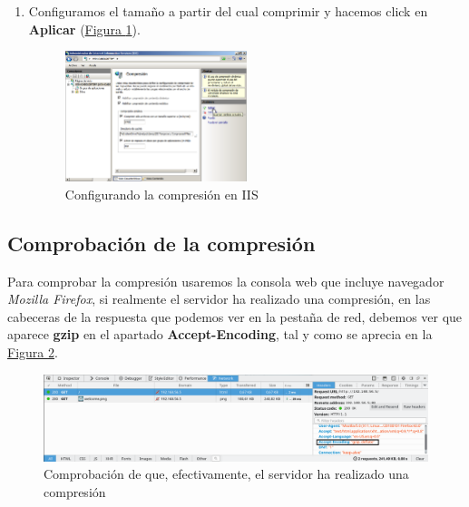\documentclass[10pt,a4paper,spanish]{article}
\numberwithin{equation}{section} %
\numberwithin{figure}{section} %
\numberwithin{table}{section} %
\begin{document}
\begin{enumerate}[1.]
    \item Configuramos el tamaño a partir del cual comprimir y hacemos click en \textbf{Aplicar} (\hyperref[confcompiis]{Figura \ref*{confcompiis}}).
    \begin{figure}[!h]
        \centering
        \includegraphics[width=0.5\textwidth]{22}
        \caption{Configurando la compresión en IIS}
        \label{confcompiis}
    \end{figure}
\end{enumerate}

\subsection{Comprobación de la compresión}
Para comprobar la compresión usaremos la consola web que incluye navegador \textit{Mozilla Firefox}, si realmente el servidor ha realizado una compresión, en las cabeceras de la respuesta que podemos ver en la pestaña de red, debemos ver que aparece \textbf{gzip} en el apartado \textbf{Accept-Encoding}, tal y como se aprecia en la \hyperref[comprcompr]{Figura \ref*{comprcompr}}.

\begin{figure}[!h]
    \centering
    \includegraphics[width=1\textwidth]{26}
    \caption{Comprobación de que, efectivamente, el servidor ha realizado una compresión}
    \label{comprcompr}
\end{figure}
\end{document}
